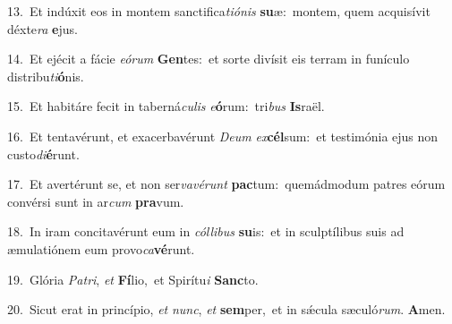 {\numbfont\textcolor{\numbcolor}{13.}}~Et indúxit eos in montem sanctifica\-\textit{ti}\-\textit{ó}\textit{nis} \textbf{su}\-æ:~\star montem, quem acquisívit déxte\textit{ra} \textbf{e}\-jus.\par
{\numbfont\textcolor{\numbcolor}{14.}}~Et ejécit a fácie \textit{e}\-\textit{ó}\textit{rum} \textbf{Gen}\-tes:~\star et sorte divísit eis terram in funículo distribu\-\textit{ti}\-\textbf{ó}nis.\par
{\numbfont\textcolor{\numbcolor}{15.}}~Et habitáre fecit in taberná\-\textit{cu}\-\textit{lis} \textit{e}\-\textbf{ó}rum:~\star tri\textit{bus} \textbf{Is}\-raël.\par
{\numbfont\textcolor{\numbcolor}{16.}}~Et tentavérunt, et exacerbavérunt \textit{De}\-\textit{um} \textit{ex}\-\textbf{cél}sum:~\star et testimónia ejus non custo\-\textit{di}\-\textbf{é}runt.\par
{\numbfont\textcolor{\numbcolor}{17.}}~Et avertérunt se, et non ser\-\textit{va}\-\textit{vé}\textit{runt} \textbf{pac}\-tum:~\star quemádmodum patres eórum convérsi sunt in ar\textit{cum} \textbf{pra}\-vum.\par
{\numbfont\textcolor{\numbcolor}{18.}}~In iram concitavérunt eum in \textit{cól}\-\textit{li}\textit{bus} \textbf{su}\-is:~\star et in sculptílibus suis ad æmulatiónem eum provo\-\textit{ca}\-\textbf{vé}runt.\par
{\numbfont\textcolor{\numbcolor}{19.}}~Glória \textit{Pa}\-\textit{tri}, \textit{et} \textbf{Fí}\-lio,~\star et Spirítu\textit{i} \textbf{Sanc}\-to.\par
{\numbfont\textcolor{\numbcolor}{20.}}~Sicut erat in princípio, \textit{et} \textit{nunc}\-, \textit{et} \textbf{sem}\-per,~\star et in sǽcula sæculó\-\textit{rum}\-. \textbf{A}\-men.\par
